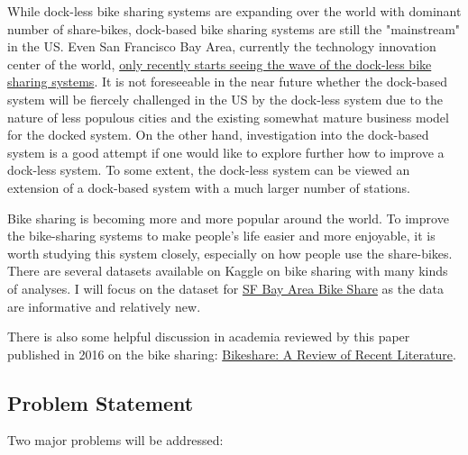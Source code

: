 \documentclass[a4paper]{article}
\begin{document}
		While dock-less bike sharing systems are expanding over the world with dominant number of share-bikes, dock-based bike sharing systems are still the "mainstream" in the US. Even San Francisco Bay Area, currently the technology innovation center of the world, \href{https://www.recode.net/2017/10/23/16496908/bike-sharing-dockless-limebike-ofo-motivate-citi-bike-spin}{only recently starts seeing the wave of the dock-less bike sharing systems}. It is not foreseeable in the near future whether the dock-based system will be fiercely challenged in the US by the dock-less system due to the nature of less populous cities and the existing somewhat mature business model for the docked system. On the other hand, investigation into the dock-based system is a good attempt if one would like to explore further how to improve a dock-less system. To some extent, the dock-less system can be viewed an extension of a dock-based system with a much larger number of stations.
		
		Bike sharing is becoming more and more popular around the world. To improve the bike-sharing systems to make people's life easier and more enjoyable, it is worth studying this system closely, especially on how people use the share-bikes. There are several datasets available on Kaggle on bike sharing with many kinds of analyses. I will focus on the dataset for \href{https://www.kaggle.com/benhamner/sf-bay-area-bike-share}{SF Bay Area Bike Share} as the data are informative and relatively new.
		
		There is also some helpful discussion in academia reviewed by this paper published in 2016 on the bike sharing:
		\href{https://nacto.org/wp-content/uploads/2016/02/2016_Fishman_Bikeshare-A-Review-of-Recent-Literature.pdf}{Bikeshare: A Review of Recent Literature}.
		
		\subsection{Problem Statement}
		Two major problems will be addressed:
		
\end{document}
